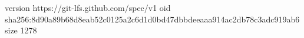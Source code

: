 version https://git-lfs.github.com/spec/v1
oid sha256:8d90a89b68d8eab52c0125a2c6d1d0bd47dbbdeeaaa914ac2db78c3adc919ab6
size 1278
